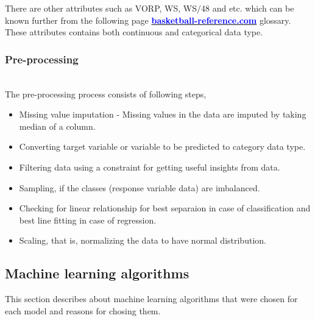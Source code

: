 \documentclass[format=sigconf]{acmart}
\begin{document}
There are other attributes such as VORP, WS, WS$/$48 and etc. which can be known further from the following page \textbf{\href{https://www.basketball-reference.com/about/glossary.html}
{\textcolor{blue}{basketball-reference.com}}} glossary. These attributes contains both continuous and categorical data type.
\subsubsection{Pre-processing}
\hfill\\
The pre-processing process consists of following steps,
\begin{itemize}
    \item Missing value imputation - Missing values in the data are imputed by taking median of a column.
    \item Converting target variable or variable to be predicted to category data type.
    \item Filtering data using a constraint for getting useful insights from data.
    \item Sampling, if the classes (response variable data) are imbalanced.
    \item Checking for linear relationship for best separaion in case of classification and best line fitting in case of regression.
    \item Scaling, that is, normalizing the data to have normal distribution.
\end{itemize}
\subsection{Machine learning algorithms}
This section describes about machine learning algorithms that were chosen for each model and reasons for chosing them.
\end{document}
